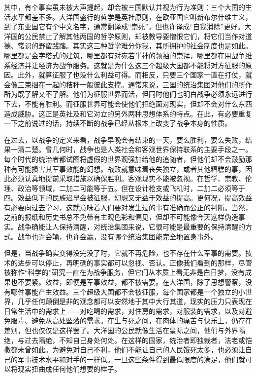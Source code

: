 其中，有个事实虽未被大声提起，却会被三国默认并视为行为准则：三个大国的生活水平都差不多。大洋国盛行的哲学是英社原则，在欧亚国它叫新布尔什维主义，到了东亚国它有个中文名字，通常翻译成``崇死''，但也许译成``自我消除''更好。大洋国的公民禁止了解其他两国的哲学原则，却被教导要憎恨它们，将它们当作对道德、常识的野蛮践踏。其实这三种哲学难分你我，其所拥护的社会制度也是如此。哪里都是金字塔式的建筑，哪里都有对宛若半神的领袖的崇拜，哪里都在用战争维系经济并让经济为战争服务。这就是为什么这三个超级大国都不能将对方征服的原因。此外，就算征服了也没什么利益可得。而相反，只要三个国家一直在打仗，就会像三束捆在一起的秸秆一般彼此支撑。通常来说，三国的统治集团对他们的所作所为既了解又不了解。他们为征服世界而活，但同时他们也明白战争必须永远进行下去，不能有胜利。而征服世界可能会使他们拒绝面对现实，但却不会对什么东西造成威胁。这正是英社及和它对立的另外两种思想体系的特点。在此，有必要重复一下之前说过的话，持续不断的战争已经从根本上改变了战争本身的性质。

在过去，以战争的定义来看，战争早晚会有结束的一天，要么胜利，要么失败，结果一清二楚。曾几何时，战争也是人类社会和客观世界保持联系的主要手段之一。每个时代的统治者都试图将虚假的世界观强加给他的追随者，但他们却不会鼓励那种有可能损害其军事效能的幻想。战败就意味着丧失独立，或者其他糟糕的事，因此必须认真地提前采取措施以确保胜利。客观现实不能被忽视。在哲学、宗教、伦理、政治等领域，二加二可能等于五。但在设计枪支或飞机时，二加二必须等于四。效益低下的民族迟早会被征服，幻想又无益于效益的提高。更何况，提高效益有必要向过去学习，这就意味着人们要对发生过的事有准确而公正的判断。当然，之前的报纸和历史书总不免带有主观色彩和偏见，但却不可能像今天这样伪造事实。战争确能让人保持清醒，对统治集团来说，它很可能是最重要的保持清醒的方式。战争也许会输，也许会赢，没有哪个统治集团能完全地置身事外。

但是，当战争确实变得没完没了时，它就不再危险，也不存在什么军事的需要。技术的进步可以停止，再明确的事实都可以忽视、否认。正像我们看到的那样，尽管被称作``科学的''研究一直在为战争服务，但它们从本质上看无非是白日梦，没有成果也不要紧。效益，即便是军事效益，都不被需要。在大洋国，除了思想警察，没有哪件事能产生效益。三个超级大国都不会被征服，每个国家都是一个独立的小世界，几乎任何颠倒是非的观念都可以安然地于其中大行其道，现实的压力只表现在日常生活中的需求上------对吃喝的需求，对住房的需求，对服装的需求，以及对避免服毒、避免从高处坠落的需求。在生与死之间，在肉体的痛苦与快乐上，仍存在差别，但也仅仅是这样罢了。大洋国的公民就像生活在星际之间，他们与外界隔绝，与过去隔绝，不知自己身处何处。在这样的国家，统治者即独裁者，法老或恺撒都未曾如此。为避免对自己不利，他们不能让自己的人民饿死太多，也必须让自己的军事技术水平和对手的一样低。一旦这些条件得到最低限度的满足，他们就可以将现实扭曲成任何他们想要的样子。

